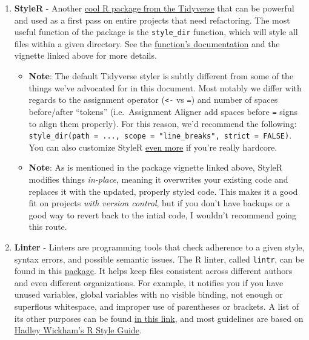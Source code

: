 \documentclass[
]{book}
\providecommand{\tightlist}{%
  \setlength{\itemsep}{0pt}\setlength{\parskip}{0pt}}
\begin{document}
\begin{enumerate}
\def\labelenumi{\arabic{enumi}.}
\setcounter{enumi}{2}
\tightlist
\item
  \textbf{StyleR} - Another \href{https://www.tidyverse.org/articles/2017/12/styler-1.0.0/}{cool R package from the Tidyverse} that can be powerful and used as a first pass on entire projects that need refactoring. The most useful function of the package is the \texttt{style\_dir} function, which will style all files within a given directory. See the \href{https://www.rdocumentation.org/packages/styler/versions/1.1.0/topics/style_dir}{function's documentation} and the vignette linked above for more details.

  \begin{itemize}
  \tightlist
  \item
    \textbf{Note}: The default Tidyverse styler is subtly different from some of the things we've advocated for in this document. Most notably we differ with regards to the assignment operator (\texttt{\textless{}-} vs \texttt{=}) and number of spaces before/after ``tokens'' (i.e.~Assignment Aligner add spaces before \texttt{=} signs to align them properly). For this reason, we'd recommend the following: \texttt{style\_dir(path\ =\ ...,\ scope\ =\ "line\_breaks",\ strict\ =\ FALSE)}. You can also customize StyleR \href{http://styler.r-lib.org/articles/customizing_styler.html}{even more} if you're really hardcore.
  \item
    \textbf{Note}: As is mentioned in the package vignette linked above, StyleR modifies things \emph{in-place}, meaning it overwrites your existing code and replaces it with the updated, properly styled code. This makes it a good fit on projects \emph{with version control}, but if you don't have backups or a good way to revert back to the intial code, I wouldn't recommend going this route.
  \end{itemize}
\item
  \textbf{Linter} - Linters are programming tools that check adherence to a given style, syntax errors, and possible semantic issues. The R linter, called \texttt{lintr}, can be found in this \href{https://www.rdocumentation.org/packages/lintr/versions/1.0.3}{package}. It helps keep files consistent across different authors and even different organizations. For example, it notifies you if you have unused variables, global variables with no visible binding, not enough or superflous whitespace, and improper use of parentheses or brackets. A list of its other purposes can be found \href{https://cran.r-project.org/web/packages/lintr/readme/README.html\#available-linters}{in this link}, and most guidelines are based on \href{http://r-pkgs.had.co.nz/style.html}{Hadley Wickham's R Style Guide}.


\end{enumerate}
\end{document}
